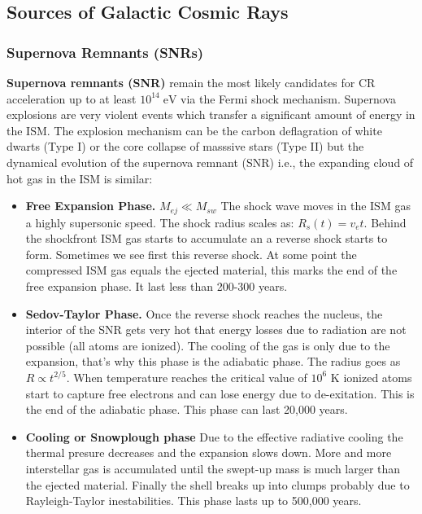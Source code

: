 \documentclass[
  letterpaper,
  DIV=11,
  numbers=noendperiod]{scrreprt}
\begin{document}
\subsection*{Sources of Galactic Cosmic
Rays}\label{sources-of-galactic-cosmic-rays}

\subsubsection*{Supernova Remnants
(SNRs)}\label{supernova-remnants-snrs}

\textbf{Supernova remnants (SNR)} remain the most likely candidates for
CR acceleration up to at least \(10^{14} \mathrm{ \; eV}\) via the Fermi
shock mechanism. Supernova explosions are very violent events which
transfer a significant amount of energy in the ISM. The explosion
mechanism can be the carbon deflagration of white dwarts (Type I) or the
core collapse of masssive stars (Type II) but the dynamical evolution of
the supernova remnant (SNR) i.e., the expanding cloud of hot gas in the
ISM is similar:

\begin{itemize}
\item
  \textbf{Free Expansion Phase.} \(M_{ej} \ll M_{sw}\) The shock wave
  moves in the ISM gas a highly supersonic speed. The shock radius
  scales as: \(R_s(t) = v_e t\). Behind the shockfront ISM gas starts to
  accumulate an a reverse shock starts to form. Sometimes we see first
  this reverse shock. At some point the compressed ISM gas equals the
  ejected material, this marks the end of the free expansion phase. It
  last less than 200-300 years.
\item
  \textbf{Sedov-Taylor Phase.} Once the reverse shock reaches the
  nucleus, the interior of the SNR gets very hot that energy losses due
  to radiation are not possible (all atoms are ionized). The cooling of
  the gas is only due to the expansion, that's why this phase is the
  adiabatic phase. The radius goes as \(R \propto t^{2/5}\). When
  temperature reaches the critical value of \(10^{6}\) K ionized atoms
  start to capture free electrons and can lose energy due to
  de-exitation. This is the end of the adiabatic phase. This phase can
  last 20,000 years.
\item
  \textbf{Cooling or Snowplough phase} Due to the effective radiative
  cooling the thermal presure decreases and the expansion slows down.
  More and more interstellar gas is accumulated until the swept-up mass
  is much larger than the ejected material. Finally the shell breaks up
  into clumps probably due to Rayleigh-Taylor inestabilities. This phase
  lasts up to 500,000 years.
\end{itemize}
\end{document}
